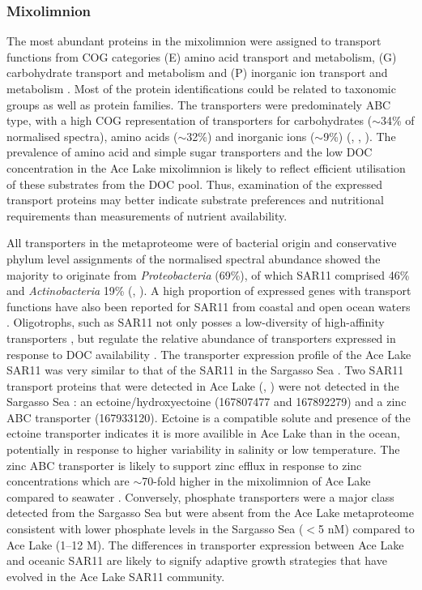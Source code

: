 \subsubsection{Mixolimnion}
The most abundant proteins in the mixolimnion were assigned to transport functions from COG categories (E) amino acid transport and metabolism, (G) carbohydrate transport and metabolism and (P) inorganic ion transport and metabolism . 
Most of the protein identifications could be related to taxonomic groups as well as protein families.
The transporters were predominately \ac{ABC} type, with a high \ac{COG} representation of transporters for carbohydrates ($\sim$34\% of normalised spectra), amino acids ($\sim$32\%) and inorganic ions ($\sim$9\%) (, ,  ).
The prevalence of amino acid and simple sugar transporters and the low \ac{DOC} concentration in the Ace Lake mixolimnion  is likely to reflect efficient utilisation of these substrates from the \ac{DOC} pool.
Thus, examination of the expressed transport proteins may better indicate substrate preferences and nutritional requirements than measurements of nutrient availability. 

All transporters in the metaproteome were of bacterial origin and conservative phylum level assignments of the normalised spectral abundance showed the majority to originate from \emph{Proteobacteria} (69\%), of which SAR11 comprised 46\% and \emph{Actinobacteria} 19\% (, ). 
A high proportion of expressed genes with transport functions have also been reported for SAR11 from coastal \cite{Poretsky2010} and open ocean waters \cite{Sowell2009, Morris2010}. 
Oligotrophs, such as SAR11 not only posses a low-diversity of high-affinity transporters \cite{Lauro2009}, but regulate the relative abundance of transporters expressed in response to \ac{DOC} availability \cite{Poretsky2010}. 
The transporter expression profile of the Ace Lake SAR11 was very similar to that of the SAR11 in the Sargasso Sea \cite{Sowell2009}.
Two SAR11 transport proteins that were detected in Ace Lake (, ) were not detected in the Sargasso Sea \cite{Sowell2009}: an ectoine/hydroxyectoine (167807477 and 167892279) and a zinc \ac{ABC} transporter (167933120). 
Ectoine is a compatible solute and presence of the ectoine transporter indicates it is more availible in Ace Lake than in the ocean, potentially in response to higher variability in salinity or low temperature.
The zinc \ac{ABC} transporter is likely to support zinc efflux in response to zinc concentrations which are $\sim$70-fold higher in the mixolimnion of Ace Lake compared to seawater \cite{Rankin1999}. 
Conversely, phosphate transporters were a major class detected from the Sargasso Sea \cite{Sowell2009} but were absent from the Ace Lake metaproteome consistent with lower phosphate levels in the Sargasso Sea ($<$5 nM) compared to Ace Lake (1--12 \textmu{}M). 
The differences in transporter expression between Ace Lake and oceanic SAR11 are likely to signify adaptive growth strategies that have evolved in the Ace Lake SAR11 community.

